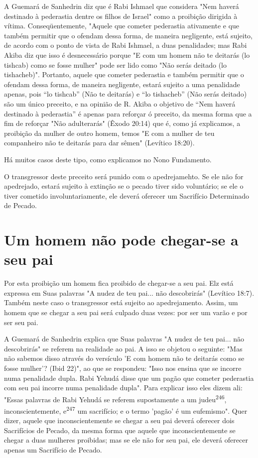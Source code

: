 A Guemará de Sanhedrin diz que é Rabi Ishmael que considera "Nem haverá
destinado à pederastia dentre os filhos de Israel" como a proibição
diri­gida à vítima. Conseqüentemente, "Aquele que cometer pederastia
ativamen­te e que também permitir que o ofendam dessa forma, de maneira
negligente, está sujeito, de acordo com o ponto de vista de Rabi
Ishmael, a duas penalida­des; mas Rabi Akiba diz que isso é
desnecessário porque "E com um homem não te deitarás (lo tishcab) como
se fosse mulher" pode ser lido como "Não serás deitado (lo tishacheb)".
Portanto, aquele que cometer pederastia e também permitir que
o ofendam dessa forma, de maneira negligente, estará
sujeito a uma penalidade apenas, pois ``lo tishcab'' (Não te deitarás) e
``lo tishacheb'' (Não serás deitado) são um único preceito, e na opinião
de R. Akiba o objetivo de ``Nem haverá destinado à pederastia'' é apenas
para reforçar ó preceito, da mesma forma que a fim de reforçar "Não
adulterarás" (Êxodo 20:14) que é, como já explicamos, a proibição da
mulher de outro homem, temos "E com a mulher de teu companheiro não te
deitarás para dar sêmen" (Levítico 18:20).


Há muitos casos deste tipo, como explicamos no Nono Fundamento.


O transgressor deste preceito será punido com o apedrejamehto. Se ele
não for apedrejado, estará sujeito à extinção se o pecado tiver sido
voluntá­rio; se ele o tiver cometido involuntariamente, ele deverá
oferecer um Sacrifí­cio Determinado de Pecado.

\section{Um homem não pode chegar-se a seu pai}

Por esta proibição um homem fica proibido de chegar-se a seu pai. Elz
está expressa em Suas palavras "A nudez de teu pai... não descobrirás"
(Le­vítico 18:7). Também neste caso o transgressor está sujeito ao
apedrejamento. Assim, um homem que se chegar a seu pai será culpado duas
vezes: por ser um varão e por ser seu pai.

A Guemará de Sanhedrin explica que Suas palavras "A nudez de teu pai...
não descobrirás" se referem na realidade ao pai. A isso se objetou o
se­guinte: "Mas não sabemos disso através do versículo 'E com homem não
te dei­tarás como se fosse mulher'? (Ibid 22)", ao que se respondeu:
"Isso nos ensina que se incorre numa penalidade dupla. Rabi Yehudá disse
que um pagão que cometer pederastia com seu pai incorre numa penalidade
dupla". Para explicar isso eles dizem ali: "Essas palavras de Rabi
Yehudá se referem supostamente a um judeu\textsuperscript{246},
inconscientemente, e\textsuperscript{247} um sacrifício; e o termo
'pagão' é um eufemismo". Quer dizer, aquele que inconscientemente se
chegar a seu pai de­verá oferecer dois Sacrifícios de Pecado, da mesma
forma que aquele que in­conscientemente se chegar a duas mulheres
proibidas; mas se ele não for seu pai, ele deverá oferecer apenas um
Sacrifício de Pecado.

